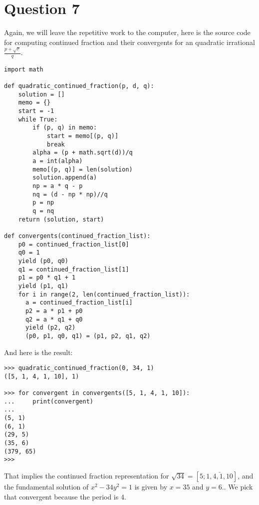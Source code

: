 \documentclass{article}
\begin{document}
\section*{Question 7}
Again, we will leave the repetitive work to the computer, here is the source code for computing continued fraction and their convergents for an quadratic irrational $ \frac{p + \sqrt{r}}{q} $.
\begin{verbatim}
import math

def quadratic_continued_fraction(p, d, q):
    solution = []
    memo = {}
    start = -1
    while True:
        if (p, q) in memo:
            start = memo[(p, q)]
            break
        alpha = (p + math.sqrt(d))/q
        a = int(alpha)
        memo[(p, q)] = len(solution)
        solution.append(a)
        np = a * q - p
        nq = (d - np * np)//q
        p = np
        q = nq
    return (solution, start)

def convergents(continued_fraction_list):
    p0 = continued_fraction_list[0]
    q0 = 1
    yield (p0, q0)
    q1 = continued_fraction_list[1]
    p1 = p0 * q1 + 1
    yield (p1, q1)
    for i in range(2, len(continued_fraction_list)):
      a = continued_fraction_list[i]
      p2 = a * p1 + p0
      q2 = a * q1 + q0
      yield (p2, q2)
      (p0, p1, q0, q1) = (p1, p2, q1, q2)
\end{verbatim}

And here is the result:
\begin{verbatim}
>>> quadratic_continued_fraction(0, 34, 1)
([5, 1, 4, 1, 10], 1)

>>> for convergent in convergents([5, 1, 4, 1, 10]):
...     print(convergent)
...
(5, 1)
(6, 1)
(29, 5)
(35, 6)
(379, 65)
>>>
\end{verbatim}

That implies the continued fraction representation for $ \sqrt{34} = [5;\bar{1,4,1,10}] $, and the fundamental solution of $ x^2 - 34y^2 = 1 $ is given by $ x = 35 $ and $ y = 6. $. We pick that convergent because the period is 4.
\end{document}
